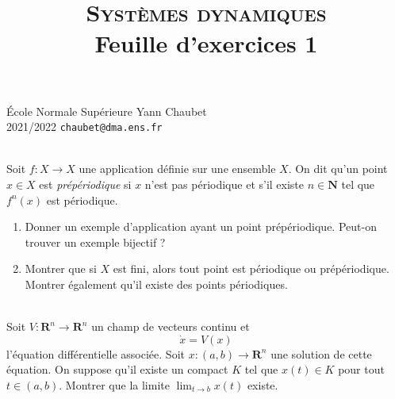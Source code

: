 \documentclass[a4paper,10pt,openany]{article}
\title{\textsc{Syst\`emes dynamiques} \\ Feuille d'exercices 1}
\date{}
\author{}
\theoremstyle{plain}
\theoremstyle{definition}
\newcommand{\R}{\mathbf{R}}
\newcommand{\N}{\mathbf{N}}
\begin{document}
{\noindent \'Ecole Normale Sup\'erieure  \hfill Yann Chaubet } \\
{2021/2022 \hfill \texttt{chaubet@dma.ens.fr}}

{\let\newpage\relax\maketitle}
\maketitle
{} \\ 

\noindent Soit $f : X \to X$ une application d\'efinie sur une ensemble $X$. On dit qu'un point $x \in X$ est \textit{pr\'ep\'eriodique} si $x$ n'est pas p\'eriodique et s'il existe $n \in \N$ tel que $f^n(x)$ est p\'eriodique.
{\begin{enumerate}
\item Donner un exemple d'application ayant un point pr\'ep\'eriodique. Peut-on trouver un exemple
bijectif ?
\item Montrer que si $X$ est fini, alors tout point est p\'eriodique ou pr\'ep\'eriodique. Montrer \'egalement qu'il existe des points p\'eriodiques.
\end{enumerate}
}
\hfill \break 

 \\ 

\noindent Soit $V : \R^n \to \R^n$ un champ de vecteurs continu et
$$
\dot{x} = V(x)
$$
l'\'equation diff\'erentielle associ\'ee. Soit $x : (a,b) \to \R^n$ une solution de cette \'equation. On suppose qu'il existe un compact $K$ tel que $x(t) \in K$ pour tout $t \in (a,b)$. Montrer que la limite $\lim_{t \to b} x(t)$ existe.
\hfill \break \\

 \\ 
\end{document}
